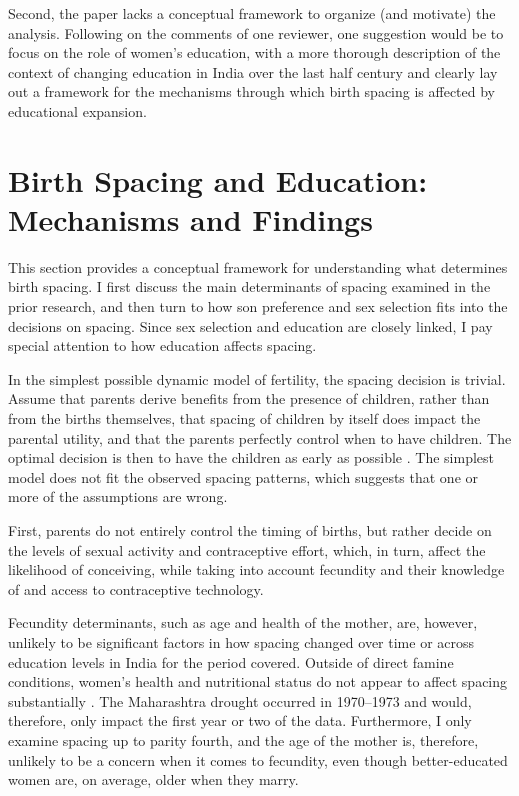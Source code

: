 Second, the paper lacks a conceptual framework to organize (and
motivate) the analysis. Following on the comments of one reviewer, one
suggestion would be to focus on the role of women’s education, with a
more thorough description of the context of changing education in India
over the last half century and clearly lay out a framework for the
mechanisms through which birth spacing is affected by educational
expansion.

\section{Birth Spacing and Education: Mechanisms and Findings}

This section provides a conceptual framework for understanding what determines  
birth spacing.
I first discuss the main determinants of spacing examined in the prior research, and 
then turn to how son preference and sex selection fits into the decisions on spacing.
Since sex selection and education are closely linked, I pay special attention to how 
education affects spacing.

In the simplest possible dynamic model of fertility, the spacing decision is trivial.
Assume that parents derive benefits from the presence of children, rather than from 
the births themselves, that spacing of children by itself does impact the parental utility, 
and that the parents perfectly control when to have children. 
The optimal decision is then to have the children as early as possible 
\citep{Newman1988}.
The simplest model does not fit the observed spacing patterns, which suggests 
that one or more of the assumptions are wrong.

First, parents do not entirely control the timing of births, but rather decide on 
the levels of sexual activity and contraceptive effort, which, in turn, affect the 
likelihood of conceiving, while taking into account fecundity and their knowledge 
of and access to contraceptive technology.

Fecundity determinants, such as age and health of the mother, are, however, unlikely 
to be significant factors in how spacing changed over time or across education levels 
in India for the period covered.
Outside of direct famine conditions, women's health and nutritional status do not 
appear to affect spacing substantially \citep{Huffman1987,John1987,lindstrom99}.
The Maharashtra drought occurred in 1970--1973 and would, therefore, only impact the first
year or two of the data.
Furthermore, I only examine spacing up to parity fourth, and the age of the mother is,
therefore, unlikely to be a concern when it comes to fecundity, even though 
better-educated women are, on average, older when they marry. 

